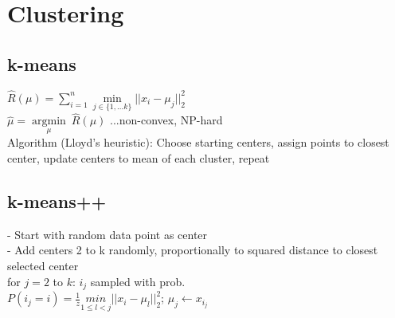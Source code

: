 \section*{Clustering}
\noindent \subsection*{k-means}

\noindent $\hat{R}(\mu) = \sum_{i=1}^n \underset{j\in\{1,...k\}}{\operatorname{min}}||x_i-\mu_j||_2^2$\\
$\hat{\mu} =  \underset{\mu}{\operatorname{argmin}} ~ \hat{R}(\mu)$ ...non-convex, NP-hard \\
Algorithm (Lloyd's heuristic): Choose starting centers, assign points to closest center, update centers to mean of each cluster, repeat

\subsection*{k-means++}
\noindent - Start with random data point as center\\
- Add centers 2 to k randomly, proportionally to squared distance to closest selected center\\
for $j=2$ to $k$:
$i_j$ sampled with prob.\\
$P(i_j=i) = \frac{1}{z} \underset{1\leq l<j}{min}||x_i-\mu_l||_2^2$; $\mu_j \leftarrow x_{i_j}$
